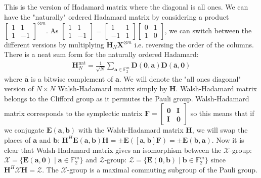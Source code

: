 \documentclass{article}
\begin{document}
This is the version of Hadamard matrix where the diagonal is all ones. We can have the "naturally" ordered Hadamard matrix by considering a product $\begin{bmatrix} 1 & 1 \\ 1 & -1 \end{bmatrix}^{\otimes m}$. As $\begin{bmatrix} 1 & 1 \\ 1 & -1 \end{bmatrix} = \begin{bmatrix} 1 & 1 \\ -1 & 1 \end{bmatrix} \begin{bmatrix} 0 & 1 \\ 1 & 0 \end{bmatrix}$, we can switch between the different versions by multiplying $\mathbf{H}_N\mathbf{X}^{\otimes m}$ i.e. reversing the order of the columns.
There is a neat sum form for the naturally ordered Hadamard:
\begin{align*}
	\mathbf{H}^{\text{nat}}_N = \frac{1}{\sqrt{N}} \sum_{\mathbf{a} \in \mathbb{F}_2^m} \mathbf{D}(\mathbf{0}, \mathbf{a}) \mathbf{D}(\overline{\mathbf{a}}, \mathbf{0})
\end{align*}
where $\overline{\mathbf{a}}$ is a bitwise complement of $\mathbf{a}$. We will denote the "all ones diagonal" version of $N \times N$ Walsh-Hadamard matrix simply by $\mathbf{H}$. 
	Walsh-Hadamard matrix belongs to the Clifford group as it permutes the Pauli group. Walsh-Hadamard matrix corresponds to the symplectic matrix $\mathbf{F} = \begin{bmatrix}
		\mathbf{0} & \mathbf{I} \\
		\mathbf{I} & \mathbf{0}
	\end{bmatrix}$
	so this means that if we conjugate $\mathbf{E}(\mathbf{a},\mathbf{b})$ with the Walsh-Hadamard matrix $\mathbf{H}$, we will swap the places of $\mathbf{a}$ and $\mathbf{b}$: $\mathbf{H}^H\mathbf{E}(\mathbf{a},\mathbf{b})\mathbf{H} = \pm \mathbf{E}(\left[\mathbf{a},\mathbf{b}\right]\mathbf{F}) = \pm \mathbf{E}(\mathbf{b},\mathbf{a})$. Now it is clear that Walsh-Hadamard matrix gives an isomorphism between the $\mathcal{X}$-group: $\mathcal{X} = \{\mathbf{E}(\mathbf{a},\mathbf{0}) \mid \mathbf{a} \in \mathbb{F}^m_2 \}$ and $\mathcal{Z}$-group: $\mathcal{Z} = \{\mathbf{E}(\mathbf{0},\mathbf{b}) \mid \mathbf{b} \in \mathbb{F}^m_2 \}$ since $\mathbf{H}^H\mathcal{X}\mathbf{H} = \mathcal{Z}$. The $\mathcal{X}$-group is a maximal commuting subgroup of the Pauli group.
	\\
	
\end{document}
